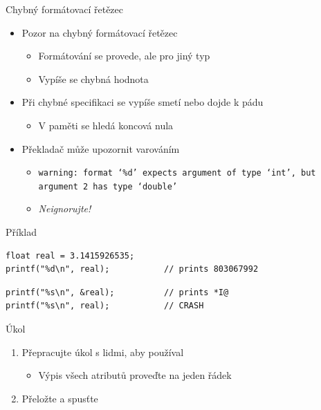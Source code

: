 \begin{frame}[fragile]{Chybný formátovací řetězec}

  \begin{itemize}
    \item Pozor na chybný formátovací řetězec
    \begin{itemize}
      \item Formátování se provede, ale pro jiný typ

      \pause

      \item Vypíše se chybná hodnota
    \end{itemize}

    \pause

    \item Při chybné specifikaci  se vypíše smetí nebo dojde k pádu
    \begin{itemize}
      \item V paměti se hledá koncová nula
    \end{itemize}

    \pause

    \item Překladač může upozornit varováním
    \begin{itemize}
      \item \scriptsize{\texttt{warning: format `\%d' expects argument of type `int', but argument 2 has type `double'}}
      \item \emph{Neignorujte!}
    \end{itemize}
  \end{itemize}

\begin{block}{Příklad}
\begin{lstlisting}
float real = 3.1415926535;
printf("%d\n", real);           // prints 803067992
\end{lstlisting}
\begin{lstlisting}
printf("%s\n", &real);          // prints *I@
printf("%s\n", real);           // CRASH
\end{lstlisting}
\end{block}

\end{frame}

\begin{frame}{Úkol}

  \begin{enumerate}
    \item Přepracujte úkol s lidmi, aby používal 
    \begin{itemize}
      \item Výpis všech atributů proveďte na jeden řádek
    \end{itemize}

    \item Přeložte a spusťte
  \end{enumerate}

\end{frame}

